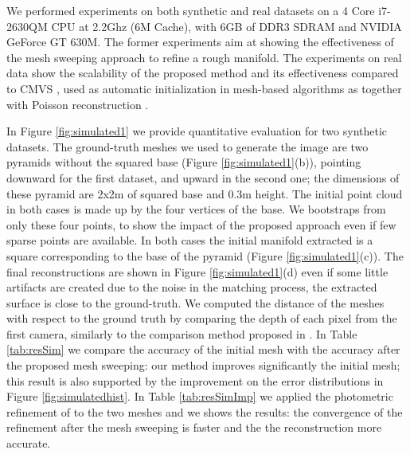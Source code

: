 We performed experiments on both synthetic and real datasets on a 4 Core i7-2630QM CPU at 2.2Ghz (6M Cache), with 6GB of DDR3 SDRAM and NVIDIA GeForce GT 630M. The former experiments aim at showing the effectiveness of the mesh sweeping approach to refine a rough manifold.
The experiments on real data show the scalability of the proposed method and its effectiveness compared to CMVS \cite{fu10}, used as automatic initialization in mesh-based algorithms as \cite{pan2015automatic,li2015detail} together with Poisson reconstruction \cite{kazhdan2006poisson}. 

In Figure \ref{fig:simulated1} we provide quantitative evaluation for two synthetic datasets.
The ground-truth meshes we used to generate the image are two pyramids without the squared base (Figure \ref{fig:simulated1}(b)), pointing downward for the first dataset, and upward in the second one; the dimensions of these pyramid are 2x2m of squared base and 0.3m height.
The initial point cloud in both cases is made up by the four vertices of the base. 
We bootstraps from only these four points, to show the impact of the proposed approach even if few sparse points are available.
In both cases the initial manifold extracted is a square corresponding to the base of the pyramid (Figure \ref{fig:simulated1}(c)).
The final reconstructions are shown in Figure \ref{fig:simulated1}(d) even if some little artifacts are created due to the noise in the matching process, the extracted surface is close to the ground-truth.
We computed the distance of the meshes with respect to the ground truth by comparing the depth of each pixel from the first camera, similarly to the comparison method proposed in \cite{strecha2008}. 
In Table \ref{tab:resSim} we compare the accuracy of the initial mesh with the accuracy after the proposed mesh sweeping: our method improves significantly the initial mesh; this result is also supported by the improvement on the error distributions in  Figure \ref{fig:simulatedhist}.
In Table \ref{tab:resSimImp} we applied the photometric refinement of \cite{vu_et_al_2012} to the two meshes and we shows the results: the convergence of the refinement after the mesh sweeping is faster and the the reconstruction more accurate.




